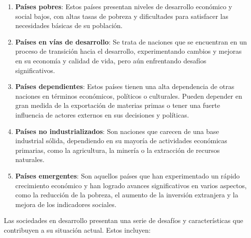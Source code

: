 \documentclass[
  jou,
  floatsintext,
  longtable,
  a4paper,
  nolmodern,
  notxfonts,
  notimes,
  12pt,
  colorlinks=true,linkcolor=blue,citecolor=blue,urlcolor=blue]{apa7}
\begin{document}
\begin{enumerate}
\def\labelenumi{\arabic{enumi}.}
\item
  \textbf{Países pobres}: Estos países presentan niveles de desarrollo
  económico y social bajos, con altas tasas de pobreza y dificultades
  para satisfacer las necesidades básicas de su población.
\item
  \textbf{Países en vías de desarrollo}: Se trata de naciones que se
  encuentran en un proceso de transición hacia el desarrollo,
  experimentando cambios y mejoras en su economía y calidad de vida,
  pero aún enfrentando desafíos significativos.
\item
  \textbf{Países dependientes}: Estos países tienen una alta dependencia
  de otras naciones en términos económicos, políticos o culturales.
  Pueden depender en gran medida de la exportación de materias primas o
  tener una fuerte influencia de actores externos en sus decisiones y
  políticas.
\item
  \textbf{Países no industrializados}: Son naciones que carecen de una
  base industrial sólida, dependiendo en su mayoría de actividades
  económicas primarias, como la agricultura, la minería o la extracción
  de recursos naturales.
\item
  \textbf{Países emergentes}: Son aquellos países que han experimentado
  un rápido crecimiento económico y han logrado avances significativos
  en varios aspectos, como la reducción de la pobreza, el aumento de la
  inversión extranjera y la mejora de los indicadores sociales.
\end{enumerate}

Las sociedades en desarrollo presentan una serie de desafíos y
características que contribuyen a su situación actual. Estos incluyen:
\end{document}
